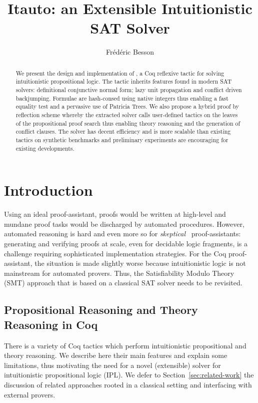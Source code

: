 \documentclass[utf8,a4paper,UKenglish,cleveref, autoref, thm-restate]{lipics-v2019}
\title{Itauto: an Extensible Intuitionistic SAT Solver}
\author{Frédéric Besson}{Inria, Univ Rennes, IRISA}{frederic.besson@inria.fr}{}{}
\begin{document}
\maketitle

\begin{abstract}
  We present the design and implementation of , a Coq
  reflexive tactic for solving intuitionistic propositional logic. The
  tactic inherits features found in modern SAT solvers: definitional
  conjunctive normal form; lazy unit propagation and conflict driven
  backjumping.
  Formulae are hash-consed using native integers thus enabling a
  fast equality test and a pervasive use of Patricia Trees.
  We also propose a hybrid proof by reflection scheme whereby the
  extracted solver calls user-defined tactics on the leaves of the
  propositional proof search thus enabling theory reasoning and the
  generation of conflict clauses.
  The solver has decent efficiency and is more scalable than existing
  tactics on synthetic benchmarks and preliminary experiments are
  encouraging for existing developments.
\end{abstract}


\section{Introduction}
\label{sec:intro}
Using an ideal proof-assistant, proofs would be written at high-level
and mundane proof tasks would be discharged by automated procedures.
%
However, automated reasoning is hard and even more so for
\emph{skeptical}~\cite{HarrisonT98} proof-assistants: generating and
verifying proofs at scale, even for decidable logic fragments, is a
challenge requiring sophisticated implementation strategies.
%
For the Coq proof-assistant, the situation is made slightly worse
because intuitionistic logic is not mainstream for automated provers.
Thus, the Satisfiability Modulo Theory (SMT) approach that is based on a
classical SAT solver needs to be revisited. 

\subsection{Propositional Reasoning and Theory Reasoning in Coq}
\label{sec:prop-in-coq}

There is a variety of Coq tactics which perform intuitionistic
propositional and theory reasoning. We describe here their main
features and explain some limitations, thus motivating the need for a
novel (extensible) solver for intuitionistic propositional logic
(IPL). We defer to Section~\ref{sec:related-work} the discussion of
related approaches rooted in a classical setting and interfacing with
external provers.
\end{document}

